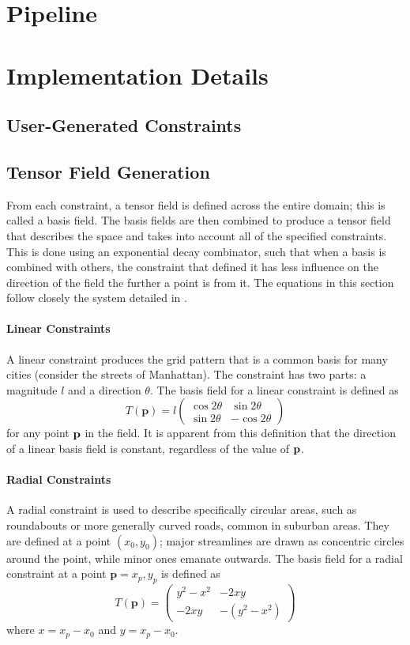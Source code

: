 \documentclass[twocolumn]{article}
\newcommand{\sqmat}[4]{\ensuremath{
    \left(\begin{array}{cc}
        #1 & #2 \\
        #3 & #4
    \end{array}\right)}}
\newcommand{\pt}{\textbf{p}}
\begin{document}
\section{Pipeline}

\section{Implementation Details}

\subsection{User-Generated Constraints}

\subsection{Tensor Field Generation}
From each constraint, a tensor field is defined across the entire domain; this
is called a basis field. The basis fields are then combined to produce a tensor
field that describes the space and takes into account all of the specified
constraints. This is done using an exponential decay combinator, such that when
a basis is combined with others, the constraint that defined it has less
influence on the direction of the field the further a point is from it. The
equations in this section follow closely the system detailed in \cite{chen}.

\paragraph{Linear Constraints}
A linear constraint produces the grid pattern that is a common basis for many
cities (consider the streets of Manhattan). The constraint has two parts: a
magnitude $l$ and a direction $\theta$. The basis field for a linear constraint
is defined as
\[
    T(\pt) =
        l\sqmat{\cos{2\theta}}{\sin{2\theta}}{\sin{2\theta}}{-\cos{2\theta}}
\]
for any point $\bf p$ in the field. It is apparent from this definition that
the direction of a linear basis field is constant, regardless of the value of
$\bf p$.

\paragraph{Radial Constraints}
A radial constraint is used to describe specifically circular areas, such as
roundabouts or more generally curved roads, common in suburban areas. They are
defined at a point $(x_0,y_0)$; major streamlines are drawn as concentric circles
around the point, while minor ones emanate outwards. The basis field for a
radial constraint at a point $\pt=x_p,y_p$ is defined as
\[
    T(\pt) = \sqmat{y^2-x^2}{-2xy}{-2xy}{-(y^2-x^2)}
\]
where $x=x_p-x_0$ and $y=x_p-x_0$.
\end{document}
